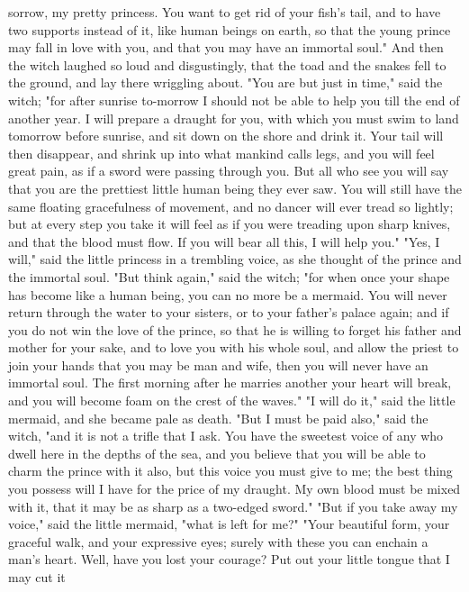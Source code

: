 sorrow, my pretty princess. You want to get rid of your fish's tail,
and to have two supports instead of it, like human beings on earth, so
that the young prince may fall in love with you, and that you may have
an immortal soul." And then the witch laughed so loud and
disgustingly, that the toad and the snakes fell to the ground, and lay
there wriggling about. "You are but just in time," said the witch;
"for after sunrise to-morrow I should not be able to help you till the
end of another year. I will prepare a draught for you, with which
you must swim to land tomorrow before sunrise, and sit down on the
shore and drink it. Your tail will then disappear, and shrink up
into what mankind calls legs, and you will feel great pain, as if a
sword were passing through you. But all who see you will say that
you are the prettiest little human being they ever saw. You will still
have the same floating gracefulness of movement, and no dancer will
ever tread so lightly; but at every step you take it will feel as if
you were treading upon sharp knives, and that the blood must flow.
If you will bear all this, I will help you."
    "Yes, I will," said the little princess in a trembling voice, as
she thought of the prince and the immortal soul.
    "But think again," said the witch; "for when once your shape has
become like a human being, you can no more be a mermaid. You will
never return through the water to your sisters, or to your father's
palace again; and if you do not win the love of the prince, so that he
is willing to forget his father and mother for your sake, and to
love you with his whole soul, and allow the priest to join your
hands that you may be man and wife, then you will never have an
immortal soul. The first morning after he marries another your heart
will break, and you will become foam on the crest of the waves."
    "I will do it," said the little mermaid, and she became pale as
death.
    "But I must be paid also," said the witch, "and it is not a trifle
that I ask. You have the sweetest voice of any who dwell here in the
depths of the sea, and you believe that you will be able to charm
the prince with it also, but this voice you must give to me; the
best thing you possess will I have for the price of my draught. My own
blood must be mixed with it, that it may be as sharp as a two-edged
sword."
    "But if you take away my voice," said the little mermaid, "what is
left for me?"
    "Your beautiful form, your graceful walk, and your expressive
eyes; surely with these you can enchain a man's heart. Well, have
you lost your courage? Put out your little tongue that I may cut it
